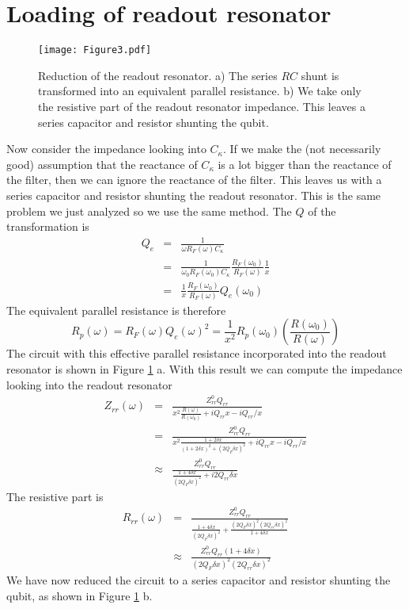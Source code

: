 \documentclass[english,aps,prl]{revtex4}
\begin{document}
\section{Loading of readout resonator}

\begin{figure}
\begin{centering}
\texttt{[image: Figure3.pdf]} 
\par\end{centering}
\caption{Reduction of the readout resonator. a) The series $RC$ shunt is transformed into an equivalent parallel resistance. b) We take only the resistive part of the readout resonator impedance. This leaves a series capacitor and resistor shunting the qubit.}
\label{Fig:3}
\end{figure}

Now consider the impedance looking into $C_{\kappa}$. If we make the (not necessarily good) assumption that the reactance of $C_{\kappa}$ is a lot bigger than the reactance of the filter, then we can ignore the reactance of the filter. This leaves us with a series capacitor and resistor shunting the readout resonator. This is the same problem we just analyzed so we use the same method. The $Q$ of the transformation is \begin{eqnarray}
Q_e &=& \frac{1}{\omega R_F(\omega) C_{\kappa}} \\
&=& \frac{1}{\omega_0 R_F(\omega_0) C_{\kappa}} \frac{R_F(\omega_0)}{R_F(\omega)} \frac{1}{x} \\
&=& \frac{1}{x}\frac{R_F(\omega_0)}{R_F(\omega)} Q_e(\omega_0) \end{eqnarray}
The equivalent parallel resistance is therefore \begin{equation}
R_p(\omega) = R_F(\omega)Q_e(\omega)^2 = \frac{1}{x^2}R_p(\omega_0) \left( \frac{R(\omega_0)}{R(\omega)}\right) \end{equation}
The circuit with this effective parallel resistance incorporated into the readout resonator is shown in Figure \ref{Fig:3} a. With this result we can compute the impedance looking into the readout resonator \begin{eqnarray}
Z_{rr}(\omega) &=& \frac{Z_{rr}^0 Q_{rr}}{x^2 \frac{R(\omega)}{R(\omega_0)} +iQ_{rr}x - iQ_{rr}/x} \\
&=& \frac{Z_{rr}^0 Q_{rr}}{x^2 \frac{1+2\delta x}{(1+2\delta x)^2+(2 Q_F \delta x)^2} +iQ_{rr}x - iQ_{rr}/x} \\
&\approx&  \frac{Z_{rr}^0 Q_{rr}}{\frac{1+4\delta x}{(2 Q_F \delta x)^2} +i2Q_{rr}\delta x} \end{eqnarray}
The resistive part is \begin{eqnarray}
R_{rr}(\omega) &=& \frac{Z_{rr}^0Q_{rr}}{\frac{1+4\delta x}{(2Q_F \delta x)^2} + \frac{(2Q_F\delta x)^2(2Q_{rr}\delta x)^2}{1+4\delta x}} \\
&\approx& \frac{Z_{rr}^0Q_{rr}(1+4\delta x)}{(2Q_F\delta x)^2(2Q_{rr}\delta x)^2} \end{eqnarray}
We have now reduced the circuit to a series capacitor and resistor shunting the qubit, as shown in Figure \ref{Fig:3} b.
\end{document}
